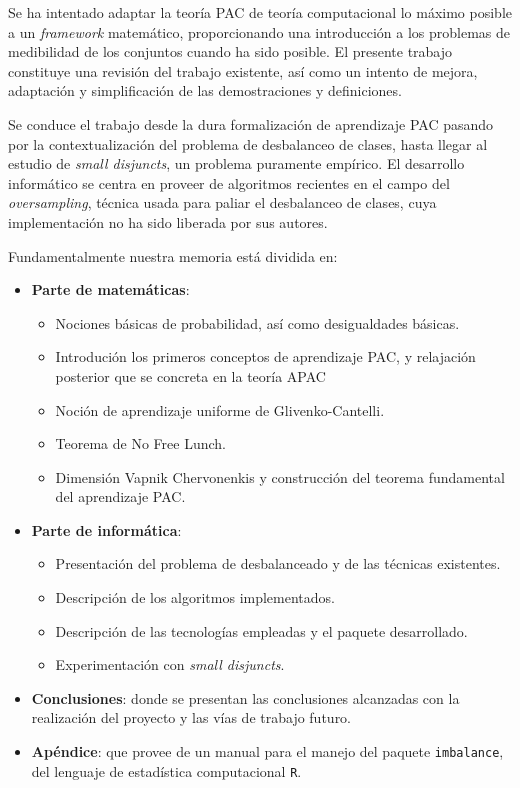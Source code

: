 Se ha intentado adaptar la teoría PAC de teoría computacional lo máximo posible a un \textit{framework} matemático, proporcionando
una introducción a los problemas de medibilidad de los conjuntos cuando ha sido posible. El presente trabajo constituye una
revisión del trabajo existente, así como un intento de mejora, adaptación y simplificación de las demostraciones y definiciones.

Se conduce el trabajo desde la dura formalización de aprendizaje PAC pasando por la contextualización del problema de 
desbalanceo de clases, hasta llegar al estudio de \textit{small disjuncts}, un problema puramente empírico. El desarrollo
informático se centra en proveer de algoritmos recientes en el campo del \textit{oversampling}, técnica usada para paliar
el desbalanceo de clases, cuya implementación no ha sido liberada por sus autores.

Fundamentalmente nuestra memoria está dividida en:
\begin{itemize}
\item \textbf{Parte de matemáticas}:
 \begin{itemize}
  \item Nociones básicas de probabilidad, así como desigualdades básicas.
  \item Introdución los primeros conceptos de aprendizaje PAC, y relajación posterior que se concreta en la teoría APAC
  \item Noción de aprendizaje uniforme de Glivenko-Cantelli.
  \item Teorema de No Free Lunch.
  \item Dimensión Vapnik Chervonenkis y construcción del teorema fundamental del aprendizaje PAC.
 \end{itemize}
\item \textbf{Parte de informática}:
 \begin{itemize}
  \item Presentación del problema de desbalanceado y de las técnicas existentes.
  \item Descripción de los algoritmos implementados.
  \item Descripción de las tecnologías empleadas y el paquete desarrollado.
  \item Experimentación con \textit{small disjuncts}.
 \end{itemize}
\item \textbf{Conclusiones}: donde se presentan las conclusiones alcanzadas con la realización del proyecto y las vías de 
 trabajo futuro.
\item \textbf{Apéndice}: que provee de un manual para el manejo del paquete \texttt{imbalance}, del lenguaje de estadística
computacional \texttt{R}.
\end{itemize}


